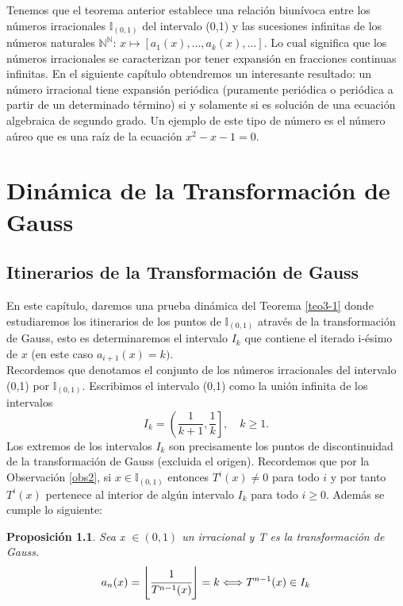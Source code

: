 \documentclass[12pt]{report}
\newtheorem{prop}{Proposición}[section]
\begin{document}
Tenemos que el teorema anterior establece una relación biunívoca entre los números irracionales $\mathbb{I}_{(0,1)}$ del intervalo (0,1) y las sucesiones infinitas de los números naturales $\mathbb{N}^{\mathbb{N}}$: $x\mapsto[a_{1}(x),\ldots,a_{k}(x),\ldots]$. Lo cual significa que los números irracionales se caracterizan por tener expansión en fracciones continuas infinitas. En el siguiente capítulo obtendremos un interesante resultado: un número irracional tiene expansión periódica (puramente periódica o periódica a partir de un determinado término) si y solamente si es solución de una ecuación algebraica de segundo grado. Un ejemplo de este tipo de número es el número aúreo que es una raíz de la ecuación $x^{2}-x-1=0$.
\newpage

\chapter{Dinámica de la Transformación de Gauss}

\section{Itinerarios de la Transformación de Gauss}
En este capítulo, daremos una prueba dinámica del Teorema \ref{teo3-1} donde estudiaremos los itinerarios de los puntos de $\mathbb{I}_{(0,1)}$ através de la transformación de Gauss, esto es determinaremos el intervalo $I_{k}$ que contiene el iterado i-ésimo de $x$ (en este caso $a_{i+1}(x)=k)$.
 \\
 
Recordemos que denotamos el conjunto de los números irracionales del intervalo (0,1) por $\mathbb{I}_{(0,1)}.$ Escribimos el intervalo (0,1) como la unión infinita de los intervalos 
$$
I_{k}=\left(\frac{1}{k+1},\frac{1}{k}\right], \quad k\geq1.
$$
Los extremos de los intervalos $I_{k}$ son precisamente los puntos de discontinuidad de la transformación de Gauss (excluida el origen). Recordemos que por la Observación \ref{obs2}, si $x\in\mathbb{I}_{(0,1)}$ entonces $T^{i}(x)\neq0$ para todo $i$ y por tanto $T^{i}(x)$ pertenece al interior de algún intervalo $I_{k}$ para todo $i\geq0$. Además se cumple lo siguiente:

\begin{prop}
Sea x $\in (0,1)$ un irracional y T es la transformación de Gauss. 
$$
a_{n}(x)=\left\lfloor\cfrac{1}{T^{n-1}(x)}\right\rfloor=k \Longleftrightarrow T^{n-1}(x)\in I_{k}
$$

\end{prop}
\end{document}
